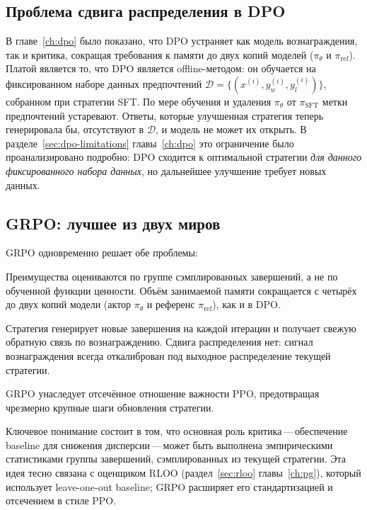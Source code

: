 \subsection{Проблема сдвига распределения в DPO}

В главе~\ref{ch:dpo} было показано, что DPO устраняет как модель вознаграждения, так и критика, сокращая требования к памяти до двух копий моделей ($\pi_\theta$ и $\pi_\mathrm{ref}$). Платой является то, что DPO является offline-методом: он обучается на фиксированном наборе данных предпочтений $\mathcal{D} = \{(x^{(i)}, y_w^{(i)}, y_l^{(i)})\}$, собранном при стратегии SFT. По мере обучения и удаления $\pi_\theta$ от $\pi_\mathrm{SFT}$ метки предпочтений устаревают. Ответы, которые улучшенная стратегия теперь генерировала бы, отсутствуют в $\mathcal{D}$, и модель не может их открыть. В разделе~\ref{sec:dpo-limitations} главы~\ref{ch:dpo} это ограничение было проанализировано подробно: DPO сходится к оптимальной стратегии \emph{для данного фиксированного набора данных}, но дальнейшее улучшение требует новых данных.

\subsection{GRPO: лучшее из двух миров}

GRPO одновременно решает обе проблемы:
\begin{description}[leftmargin=!,labelwidth=3.5cm]
  \item[Без критика] Преимущества оцениваются по группе сэмплированных завершений, а не по обученной функции ценности. Объём занимаемой памяти сокращается с четырёх до двух копий модели (актор $\pi_\theta$ и референс $\pi_\mathrm{ref}$), как и в DPO.
  \item[Онлайн-режим] Стратегия генерирует новые завершения на каждой итерации и получает свежую обратную связь по вознаграждению. Сдвига распределения нет: сигнал вознаграждения всегда откалиброван под выходное распределение текущей стратегии.
  \item[Стабильные обновления] GRPO унаследует отсечённое отношение важности PPO, предотвращая чрезмерно крупные шаги обновления стратегии.
\end{description}
Ключевое понимание состоит в том, что основная роль критика\,---\,обеспечение baseline для снижения дисперсии\,---\,может быть выполнена эмпирическими статистиками группы завершений, сэмплированных из текущей стратегии. Эта идея тесно связана с оценщиком RLOO (раздел~\ref{sec:rloo} главы~\ref{ch:pg}), который использует leave-one-out baseline; GRPO расширяет его стандартизацией и отсечением в стиле PPO.

